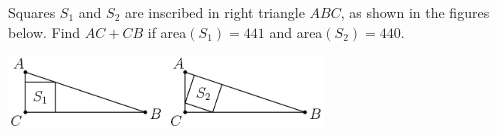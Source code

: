 Squares $S_1$ and $S_2$ are inscribed in right triangle $ABC$, as shown in the figures below.  Find $AC + CB$ if area$(S_1) = 441$ and area$(S_2) = 440$.

\begin{center}
\includegraphics[width = 83.60000000000001mm]{img/fig0.png}
\end{center}